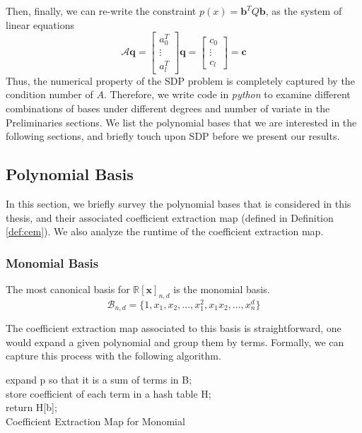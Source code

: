 \documentclass[12pt]{amsart}
\numberwithin{equation}{section}
\theoremstyle{definition}
\numberwithin{thm}{section}
\begin{document}
\smallskip
Then, finally, we can re-write the constraint $p(x) = \mathbf{b}^T Q \mathbf{b}$, as the system of linear equations 
\begin{equation*}
     \mathcal{A} \mathbf{q} = \begin{bmatrix}
          a_0^T \\
          \vdots \\
          a_l^T
     \end{bmatrix} \mathbf{q} = \begin{bmatrix}
          c_0 \\
          \vdots \\
          c_l
     \end{bmatrix} = \mathbf{c}
\end{equation*}
Thus, the numerical property of the SDP problem is completely captured by the condition number of $A$. 
Therefore, we write code in \emph{python} to examine different combinations of bases under different degrees and number of variate in the Preliminaries sections. 
We list the polynomial bases that we are interested in the following sections, and briefly touch upon SDP before we present our results.

\subsection{Polynomial Basis}
\label{Sec:polynomial Basis}
In this section, we briefly survey the polynomial bases that is considered in this thesis,
and their associated {coefficient extraction map} (defined in Definition \ref{def:cem}).
We also analyze the runtime of the {coefficient extraction map}.

\subsubsection{Monomial Basis}
\label{alg:mcem}
The most canonical basis for $\mathbb{R}[\mathbf{x}]_{n, d}$ is the monomial basis. 
\begin{equation*}
     \mathcal{B}_{n, d} = \{1, x_1, x_2, ..., x_1^2, x_1 x_2, ..., x_n^d\}
\end{equation*}

The {coefficient extraction map} associated to this basis is straightforward, 
one would expand a given polynomial and group them by terms. Formally, we can capture this process with the following algorithm.

\begin{algorithm}[H]
     
     \SetAlgoLined
     expand p so that it is a sum of terms in B;\\
     store coefficient of each term in a hash table H;\\
     return H[b];\\
     \caption{Coefficient Extraction Map for Monomial}
\end{algorithm}
\end{document}

